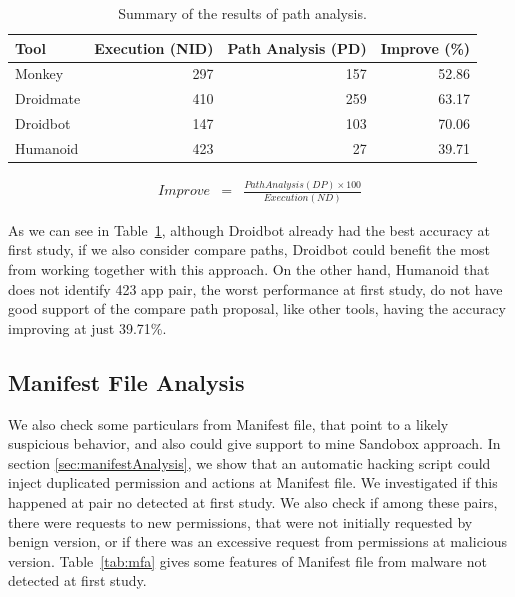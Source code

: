 \begin{table}[ht]
  \caption{Summary of the results of path analysis. }
  \centering
  \begin{small}
 \begin{tabular}{lrrr}
   \toprule
   Tool & Execution (NID) & Path Analysis (PD) & Improve (\%) \\   \midrule
   Monkey &  297 & 157 & 52.86 \\ 
   Droidmate &  410 & 259 & 63.17 \\ 
   Droidbot &  147 & 103 & 70.06 \\ 
   Humanoid &  423 & 27 & 39.71 \\ 
 \bottomrule
 \end{tabular}
 \end{small}
 \label{tab:pa}
\end{table}

\begin{eqnarray}
Improve & = & \frac{Path Analysis (DP) \times 100}{Execution (ND)} 
\label{improve}
\end{eqnarray}

As we can see in Table~\ref{tab:pa}, although Droidbot already had the best accuracy at first study, if we also consider compare paths, Droidbot could benefit the most from working together with this approach. On the other hand, Humanoid that does not identify 423 app pair, the worst performance at first study, do not have good support of the compare path proposal, like other tools, having the accuracy improving at just 39.71\%.

\subsection{Manifest File Analysis}\label{sec:manifest}

We also check some particulars from Manifest file, that point to a likely suspicious behavior, and also could give support to mine Sandobox approach. In section \ref{sec:manifestAnalysis}, we show that an automatic hacking script could inject duplicated permission and actions at Manifest file. We investigated if this happened at pair no detected at first study. We also check if among these pairs, there were requests to new permissions, that were not initially requested by benign version, or if there was an excessive request from permissions at malicious version. Table~\ref{tab:mfa} gives some features of Manifest file from malware not detected at first study. 

